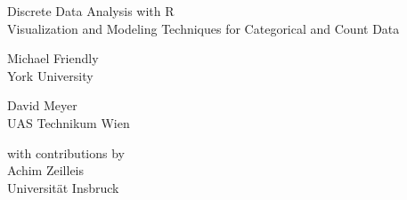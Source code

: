 \setcounter{page}{1}
\bigskip
\begin{center}
\Huge{Discrete Data Analysis with R} \\
\LARGE{Visualization and Modeling Techniques for Categorical and Count Data}
\end{center}
\bigskip
\bigskip

  \begin{minipage}[c]{.5\textwidth}
  	\begin{center}
   	{\Large Michael Friendly} \\ York University
   	\end{center}
   \end{minipage}%
  \hfill
  \begin{minipage}[c]{.5\textwidth}
		\begin{center}  
		{\Large David Meyer} \\ UAS Technikum Wien
   	\end{center}
  \end{minipage}

\bigskip
\begin{center}
with contributions by \\ {\Large Achim Zeilleis} \\ Universit\"at Insbruck
\end{center}



